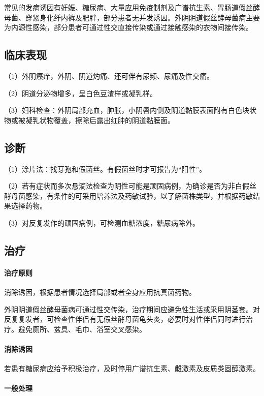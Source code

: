 常见的发病诱因有妊娠、糖尿病、大量应用免疫制剂及广谱抗生素、胃肠道假丝酵母菌、穿紧身化纤内裤及肥胖，部分患者无并发诱因。外阴阴道假丝酵母菌病主要为内源性感染，部分患者可通过性交直接传染或通过接触感染的衣物间接传染。

\subsection{临床表现}

（1）外阴瘙痒，外阴、阴道灼痛、还可伴有尿频、尿痛及性交痛。

（2）阴道分泌物增多，呈白色豆渣样或凝乳样。

（3）妇科检查：外阴局部充血，肿胀，小阴唇内侧及阴道黏膜表面附有白色块状物或被凝乳状物覆盖，擦除后露出红肿的阴道黏膜面。

\subsection{诊断}

（1）涂片法：找芽孢和假菌丝。有假菌丝时才可报告为“阳性”。

（2）若有症状而多次悬滴法检查为阴性可能是顽固病例，为确诊是否为非白假丝酵母菌感染，有条件的可采用培养法及药敏试验，以了解菌株类型，并根据药敏结果选择药物。

（3）对反复发作的顽固病例，可检测血糖浓度，糖尿病除外。

\subsection{治疗}
\paragraph{治疗原则}

消除诱因，根据患者情况选择局部或者全身应用抗真菌药物。

外阴阴道假丝酵母菌病可通过性交传染，治疗期间应避免性生活或采用阴茎套。对反复复发者，可检查性伴侣有无假丝酵母菌龟头炎，必要时对性伴侣同时进行治疗。避免厕所、盆具、毛巾、浴室交叉感染。
\paragraph{消除诱因}

若患有糖尿病应给予积极治疗，及时停用广谱抗生素、雌激素及皮质类固醇激素。
\paragraph{一般处理}

